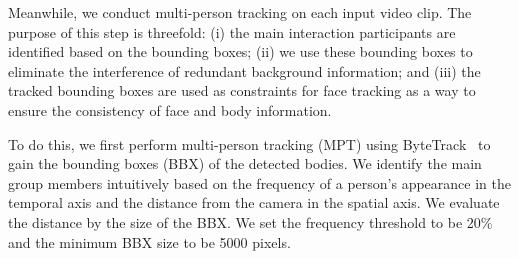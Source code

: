 \documentclass[VANCOUVER,STIX1COL]{WileyNJD-v2}
\begin{document}
Meanwhile, we conduct multi-person tracking on each input video clip. The purpose of this step is threefold: (i) the main interaction participants are identified based on the bounding boxes; (ii) we use these bounding boxes to eliminate the interference of redundant background information; and (iii) the tracked bounding boxes are used as constraints for face tracking as a way to ensure the consistency of face and body information.

To do this, we first perform multi-person tracking (MPT) using ByteTrack~\cite{Zhang2021ByteTrack} to gain the bounding boxes (BBX) of the detected bodies. We identify the main group members intuitively based on the frequency of a person's appearance in the temporal axis and the distance from the camera in the spatial axis. We evaluate the distance by the size of the BBX. We set the frequency threshold to be 20\% and the minimum BBX size to be 5000 pixels.
\end{document}
